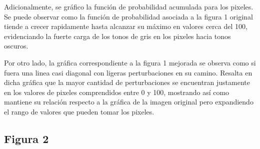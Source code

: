 \documentclass[11pt, letterpaper]{article}
\begin{document}
Adicionalmente, se gráfico la función de probabilidad acumulada para los pixeles. Se puede observar como la función de probabilidad asociada a la figura 1 original tiende a crecer rapidamente hasta alcanzar su máximo en valores cerca del 100, evidenciando la fuerte carga de los tonos de gris en los pixeles hacia tonos oscuros.

Por otro lado, la gráfica correspondiente a la figura 1 mejorada se observa como si fuera una linea casi diagonal con ligeras perturbaciones en su camino.
Resalta en dicha gráfica que la mayor cantidad de perturbaciones se encuentran justamente en los valores de pixeles comprendidos entre 0 y 100, mostrando así como mantiene su relación respecto a la gráfica de la imagen original pero expandiendo el rango de valores que pueden tomar los pixeles.


\newpage

	
 \subsection{Figura 2}
\end{document}
